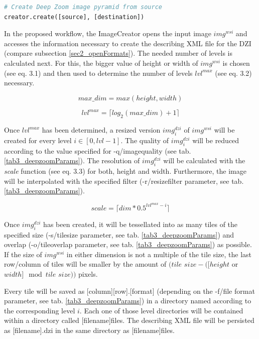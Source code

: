 \begin{lstlisting}[frame=single, language=python]
# Create Deep Zoom image pyramid from source
creator.create([source], [destination])
\end{lstlisting}

In the proposed workflow, the ImageCreator opens the input image $img^{wsi}$ and accesses the information necessary to create the describing XML file for the DZI (compare subsection \ref{sec2_openFormats}). The needed number of levels is calculated next. For this, the bigger value of height or width of $img^{wsi}$ is chosen (see eq. 3.1) and then used to determine the number of levels $lvl^{max}$ (see eq. 3.2) necessary.

\begin{equation}
	max{\_}dim = max(height, width)
\end{equation}

\begin{equation}
	lvl^{max} = {\lceil}log_2(max{\_}dim) + 1\rceil
\end{equation}

Once $lvl^{max}$ has been determined, a resized version $img^{dzi}_i$ of $img^{wsi}$ will be created for every level $i \in [0, lvl-1]$. The quality of $img^{dzi}_i$ will be reduced according to the value specified for -q/image{\textunderscore}quality (see tab. \ref{tab3_deepzoomParams}). The resolution of $img^{dzi}_i$ will be calculated with the \emph{scale} function (see eq. 3.3) for both, height and width. Furthermore, the image will be interpolated with the specified filter (-r/resize{\textunderscore}filter parameter, see tab. \ref{tab3_deepzoomParams}).

\begin{equation}
	scale = {\lceil}dim * 0.5^{lvl^{max}-i}\rceil
\end{equation}

Once $img^{dzi}_i$ has been created, it will be tessellated into as many tiles of the specified size (-s/tile{\textunderscore}size parameter, see tab. \ref{tab3_deepzoomParams}) and overlap (-o/tile{\textunderscore}overlap parameter, see tab. \ref{tab3_deepzoomParams}) as possible. If the size of $img^{wsi}$ in either dimension is not a multiple of the tile size, the last row/column of tiles will be smaller by the amount of $(tile$ $size - ([height$ or $width] \mod tile$ $size))$ pixels.

Every tile will be saved as [column]{\textunderscore}[row].[format] (depending on the -f/file{\textunderscore} format parameter, see tab. \ref{tab3_deepzoomParams}) in a directory named according to the corresponding level $i$. Each one of those level directories will be contained within a directory called [filename]{\textunderscore}files. The describing XML file will be persisted as [filename].dzi in the same directory as [filename]{\textunderscore}files.


